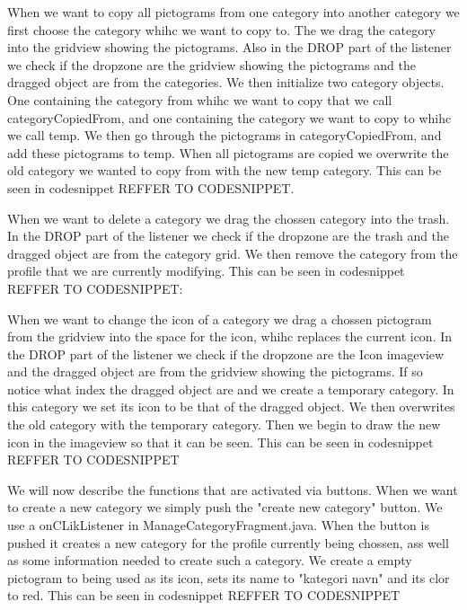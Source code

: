 
When we want to copy all pictograms from one category into another category we first choose the category whihc we want to copy to. 
The we drag the category into the gridview showing the pictograms. 
Also in the DROP part of the listener we check if the dropzone are the gridview showing the pictograms and the dragged object are from the categories.
We then initialize two category objects. 
One containing the category from whihc we want to copy that we call categoryCopiedFrom, and one containing the category we want to copy to whihc we call temp. 
We then go through the pictograms in categoryCopiedFrom, and add these pictograms to temp. 
When all pictograms are copied we overwrite the old category we wanted to copy from with the new temp category. 
This can be seen in codesnippet REFFER TO CODESNIPPET.


When we want to delete a category we drag the chossen category into the trash. 
In the DROP part of the listener we check if the dropzone are the trash and the dragged object are from the category grid. 
We then remove the category from the profile that we are currently modifying. 
This can be seen in codesnippet REFFER TO CODESNIPPET:


When we want to change the icon of a category we drag a chossen pictogram from the gridview into the space for the icon, whihc replaces the current icon. 
In the DROP part of the listener we check if the dropzone are the Icon imageview and the dragged object are from the gridview showing the pictograms. 
If so notice what index the dragged object are and we create a temporary category. 
In this category we set its icon to be that of the dragged object.  
We then overwrites the old category with the temporary category.
Then we begin to draw the new icon in the imageview so that it can be seen. 
This can be seen in codesnippet REFFER TO CODESNIPPET 


We will now describe the functions that are activated via buttons.
When we want to create a new category we simply push the "create new category" button. 
We use a onCLikListener in ManageCategoryFragment.java. 
When the button is pushed it creates a new category for the profile currently being chossen, ass well as some information needed to create such a category. 
We create a empty pictogram to being used as its icon, sets its name to "kategori navn" and its clor to red. 
This can be seen in codesnippet REFFER TO CODESNIPPET

